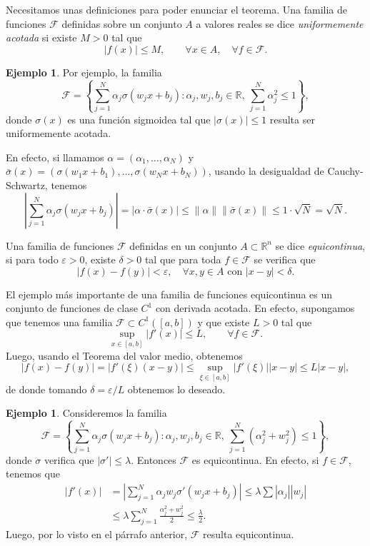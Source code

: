 \documentclass[12pt, a4paper]{amsbook}
\newcommand{\ve}{\varepsilon}
\newcommand{\R}{{\mathbb R}}
\newcommand{\F}{{\mathcal F}}
\theoremstyle{remark}
\theoremstyle{definition}
\newtheorem{ejem}[teo]{Ejemplo}
\numberwithin{section}{chapter}
\numberwithin{subsection}{section}
\numberwithin{equation}{section}
\numberwithin{figure}{chapter}
\begin{document}
Necesitamos unas definiciones para poder enunciar el teorema. Una familia de funciones $\F$ definidas sobre un conjunto $A$ a valores reales se dice {\em uniformemente acotada} si existe $M>0$ tal que
$$
|f(x)|\le M,\qquad \forall x\in A,\quad \forall f\in \F.
$$

\begin{ejem}\label{ej7.2.2}
Por ejemplo, la familia
$$
\F = \left\{ \sum_{j=1}^N \alpha_j \sigma(w_j x + b_j)\colon \alpha_j, w_j, b_j\in\R,\ \sum_{j=1}^N \alpha_j^2 \le 1\right\},
$$
donde $\sigma(x)$ es una función sigmoidea tal que $|\sigma(x)|\le 1$ resulta ser uniformemente acotada. 

En efecto, si llamamos $\alpha = (\alpha_1,\dots,\alpha_N)$ y $\bar\sigma(x) = (\sigma(w_1 x+b_1),\dots, \sigma(w_N x+b_N))$, usando la desigualdad de Cauchy-Schwartz, tenemos
$$
\left|\sum_{j=1}^N \alpha_j \sigma(w_j x + b_j)\right| = |\alpha\cdot \bar\sigma(x)|\le \|\alpha\| \|\bar\sigma(x)\| \le 1\cdot \sqrt{N} = \sqrt{N}.
$$
\end{ejem}

Una familia de funciones $\F$ definidas en un conjunto $A\subset \R^n$ se dice {\em equicontinua}, si para todo $\ve>0$, existe $\delta>0$ tal que para toda $f\in\F$ se verifica que
$$
|f(x)-f(y)|<\ve,\quad \forall x, y\in A \text{ con } |x-y|<\delta.
$$

El ejemplo más importante de una familia de funciones equicontinua es un conjunto de funciones de clase $C^1$ con derivada acotada. En efecto, supongamos que tenemos una familia $\F\subset C^1([a, b])$ y que existe $L>0$ tal que
$$
\sup_{x\in [a, b]} |f'(x)|\le L,\qquad \forall f\in \F.
$$
Luego, usando el Teorema del valor medio, obtenemos
$$
|f(x)-f(y)| = |f'(\xi) (x-y)|\le \sup_{\xi\in [a, b]}|f'(\xi)| |x-y|\le L|x-y|,
$$
de donde tomando $\delta = \ve/L$ obtenemos lo deseado.

\begin{ejem}\label{ej7.2.4}
Consideremos la familia
$$
\F = \left\{\sum_{j=1}^N \alpha_j \sigma(w_j x + b_j)\colon \alpha_j, w_j, b_j\in\R,\ \sum_{j=1}^N (\alpha_j^2 + w_j^2) \le 1\right\},
$$
donde $\sigma$ verifica  que $|\sigma'|\le \lambda$. Entonces $\F$ es equicontinua. En efecto, si $f\in \F$, tenemos que
\begin{align*}
|f'(x)| &= \left|\sum_{j=1}^N \alpha_j w_j\sigma'(w_j x+b_j)\right|\le \lambda\sum |\alpha_j||w_j|\\
&\le \lambda\sum_{j=1}^N \frac{\alpha_j^2 + w_j^2}{2} \le \frac{\lambda}{2}.
\end{align*}
Luego, por lo visto en el párrafo anterior, $\F$ resulta equicontinua.
\end{ejem}
\end{document}

